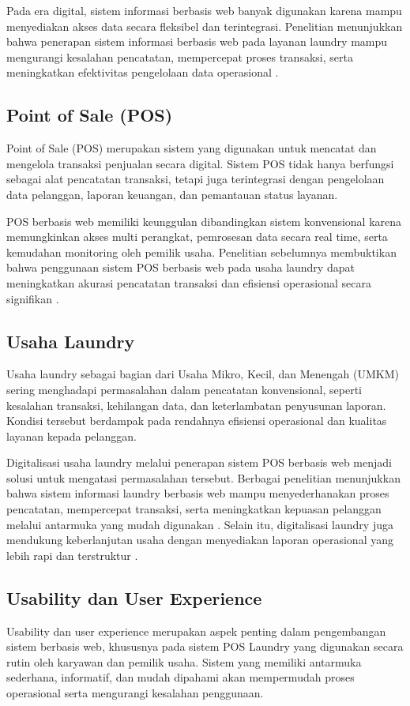 Pada era digital, sistem informasi berbasis web banyak digunakan karena mampu menyediakan akses data secara fleksibel dan terintegrasi. Penelitian menunjukkan bahwa penerapan sistem informasi berbasis web pada layanan laundry mampu mengurangi kesalahan pencatatan, mempercepat proses transaksi, serta meningkatkan efektivitas pengelolaan data operasional \cite{Achyani2024,Mutia2025,Maulana2025}.

\subsection{Point of Sale (POS)}
\indent
Point of Sale (POS) merupakan sistem yang digunakan untuk mencatat dan mengelola transaksi penjualan secara digital. Sistem POS tidak hanya berfungsi sebagai alat pencatatan transaksi, tetapi juga terintegrasi dengan pengelolaan data pelanggan, laporan keuangan, dan pemantauan status layanan.

POS berbasis web memiliki keunggulan dibandingkan sistem konvensional karena memungkinkan akses multi perangkat, pemrosesan data secara real time, serta kemudahan monitoring oleh pemilik usaha. Penelitian sebelumnya membuktikan bahwa penggunaan sistem POS berbasis web pada usaha laundry dapat meningkatkan akurasi pencatatan transaksi dan efisiensi operasional secara signifikan \cite{Singh2022,Kalo2023}.

\subsection{Usaha Laundry}
\indent
Usaha laundry sebagai bagian dari Usaha Mikro, Kecil, dan Menengah (UMKM) sering menghadapi permasalahan dalam pencatatan konvensional, seperti kesalahan transaksi, kehilangan data, dan keterlambatan penyusunan laporan. Kondisi tersebut berdampak pada rendahnya efisiensi operasional dan kualitas layanan kepada pelanggan.

Digitalisasi usaha laundry melalui penerapan sistem POS berbasis web menjadi solusi untuk mengatasi permasalahan tersebut. Berbagai penelitian menunjukkan bahwa sistem informasi laundry berbasis web mampu menyederhanakan proses pencatatan, mempercepat transaksi, serta meningkatkan kepuasan pelanggan melalui antarmuka yang mudah digunakan \cite{SigitSugiharto2023,Achyani2024,Mutia2025}. Selain itu, digitalisasi laundry juga mendukung keberlanjutan usaha dengan menyediakan laporan operasional yang lebih rapi dan terstruktur \cite{Lizal2025,Maulana2025}.

\subsection{Usability dan User Experience}
\indent
Usability dan user experience merupakan aspek penting dalam pengembangan sistem berbasis web, khususnya pada sistem POS Laundry yang digunakan secara rutin oleh karyawan dan pemilik usaha. Sistem yang memiliki antarmuka sederhana, informatif, dan mudah dipahami akan mempermudah proses operasional serta mengurangi kesalahan penggunaan.

